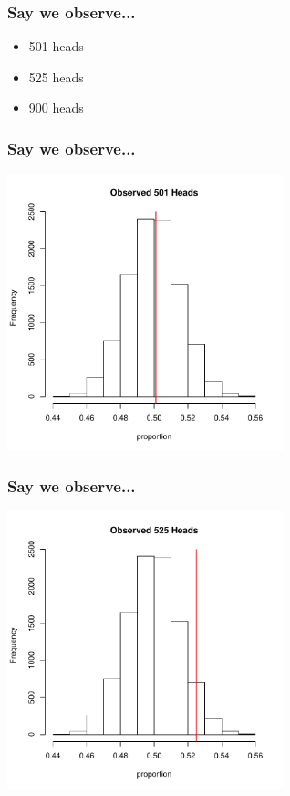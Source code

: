 \documentclass[handout]{beamer}
\begin{document}
\begin{frame}
\frametitle{Say we observe...}
\begin{itemize}
\item 501 heads
\item 525 heads
\item 900 heads
\end{itemize}
\end{frame}
\begin{frame}
\frametitle{Say we observe...}
\begin{center}
\includegraphics[width=0.6\textwidth]{figure/hist2}
\end{center}
\end{frame}
\begin{frame}
\frametitle{Say we observe...}
\begin{center}
\includegraphics[width=0.6\textwidth]{figure/hist3}
\end{center}
\end{frame}
\end{document}
